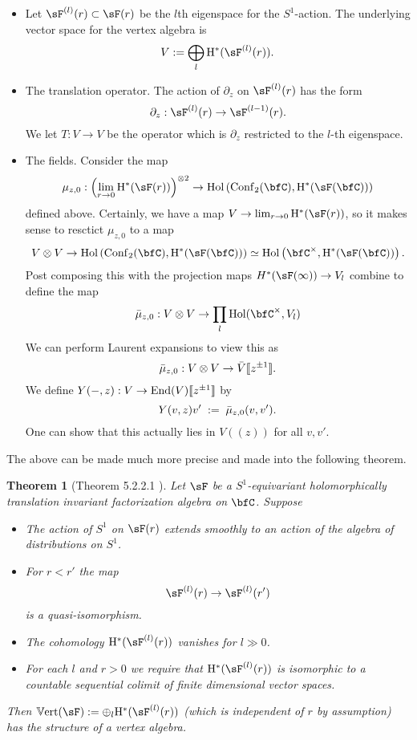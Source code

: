 \documentclass[12pt]{amsart}
\newtheorem{theorem}{Theorem}[section]
\theoremstyle{definition}
\theoremstyle{remark}
\def\tensor{\otimes}
\begin{document}
\begin{itemize}
\item Let $\sF^{(l)}(r) \subset \sF(r)$ be the $l$th eigenspace for the $S^1$-action. The underlying vector
space for the vertex algebra is
\[
V := \bigoplus_l {\rm H}^*(\sF^{(l)}(r)) .
\]
\item The translation operator. The action of $\partial_z$ on $\sF^{(l)}(r)$ has the form
\[
\partial_z : \sF^{(l)}(r) \to 
\sF^{(l-1)}(r) .
\]
We let $T : V \to V$ be the operator which is $\partial_z$ restricted
to the $l$-th eigenspace. 
\item The fields. Consider the map
\[
\mu_{z,0} : \left(\lim_{r \to 0} {\rm
    H}^*(\sF(r))\right)^{\tensor 2} \to {\rm Hol}\left({\rm
  Conf}_2(\bfC), {\rm H}^*(\sF(\bfC))\right)
\]
defined above. Certainly, we have a map $V
  \to \lim_{r \to 0} {\rm
    H}^*(\sF(r))$, so it makes sense to resctict $\mu_{z,0}$ to a
  map 
\[
V \tensor V \to {\rm Hol}\left({\rm Conf}_2(\bfC), {\rm
    H}^*(\sF(\bfC))\right) \simeq {\rm Hol}\left(\bfC^\times, {\rm
    H}^*(\sF(\bfC))\right) .
\]
Post composing this with the projection maps $H^*(\sF(\infty)) \to
V_l$ combine to define the map
\[
\Bar{\mu}_{z,0} : V \tensor V \to \prod_l {\rm Hol}(\bfC^\times, V_l)
\]
We can perform Laurent expansions to view this as
\[
\Bar{\mu}_{z,0} : V \tensor V \to \Bar{V} \llbracket z^{\pm 1}
\rrbracket .
\]
We define $Y(-,z) : V \to {\rm End}(V)\llbracket z^{\pm 1}\rrbracket$ by
\[
Y(v,z) v' \; := \; \Bar{\mu}_{z,0}(v,v') .
\]
One can show that this actually lies in $V((z))$ for all $v,v'$. 
\end{itemize}

The above can be made much more precise and made into the following
theorem. 

\begin{theorem}[Theorem 5.2.2.1 \cite{CG1}] \label{fv} Let $\sF$ be a $S^1$-equivariant holomorphically translation invariant factorization algebra on $\bfC$. Suppose
\begin{itemize}
\item The action of $S^1$ on $\sF(r)$ extends smoothly to an action of the algebra of distributions on $S^1$. 
\item For $r < r'$ the map 
\[
\sF^{(l)}(r) \to \sF^{(l)}(r')
\]
is a quasi-isomorphism.
\item The cohomology ${\rm H}^*(\sF^{(l)}(r))$ vanishes for $l \gg 0$.
\item For each $l$ and $r > 0$ we require that ${\rm H}^*(\sF^{(l)}(r))$ is isomorphic to a countable sequential colimit of finite dimensional vector spaces. 
\end{itemize}
Then $\mathbb{V}{\rm ert} (\sF) := \oplus_l {\rm H}^*(\sF^{(l)}(r))$ (which is independent of $r$ by assumption) has the structure of a vertex algebra.
\end{theorem}
\end{document}
